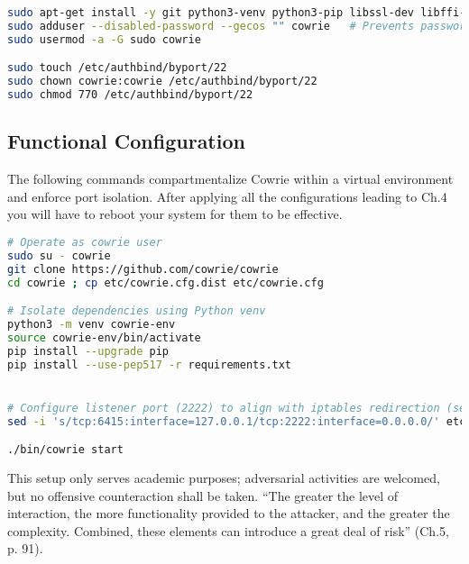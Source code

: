 \documentclass{cls/ULBreport}
\begin{document}
    \begin{lstlisting}[language=bash,caption={Cowrie User Creation}]
sudo apt-get install -y git python3-venv python3-pip libssl-dev libffi-dev build-essential libpython3-dev authbind
sudo adduser --disabled-password --gecos "" cowrie   # Prevents password-based connections 
sudo usermod -a -G sudo cowrie

sudo touch /etc/authbind/byport/22
sudo chown cowrie:cowrie /etc/authbind/byport/22
sudo chmod 770 /etc/authbind/byport/22\end{lstlisting}

    \subsection{Functional Configuration}
    The following commands compartmentalize Cowrie within a virtual environment and enforce port isolation. After applying all the configurations leading to Ch.4 you will have to reboot your system for them to be effective.
    \begin{lstlisting}[language=bash,caption={Cowrie Honeypot Setup}]
# Operate as cowrie user
sudo su - cowrie  
git clone https://github.com/cowrie/cowrie  
cd cowrie ; cp etc/cowrie.cfg.dist etc/cowrie.cfg 

# Isolate dependencies using Python venv
python3 -m venv cowrie-env  
source cowrie-env/bin/activate  
pip install --upgrade pip
pip install --use-pep517 -r requirements.txt


# Configure listener port (2222) to align with iptables redirection (section 2.3)
sed -i 's/tcp:6415:interface=127.0.0.1/tcp:2222:interface=0.0.0.0/' etc/cowrie.cfg

./bin/cowrie start\end{lstlisting}



    \begin{tcolorbox}[  
        colback=red!5!white,  
        colframe=red!75!black,  
        title={\textbf{\textcolor{black}{Security Disclaimer}}},
        fontupper=\small,  
        sharp corners  
    ]  
    This setup only serves academic purposes; adversarial activities are welcomed, but no offensive counteraction shall be taken. \enquote{The greater the level of interaction, the more functionality provided to the attacker, and the greater the complexity. Combined, these elements can introduce a great deal of risk} (Ch.5, p. 91).
    \end{tcolorbox}  
    
\end{document}
